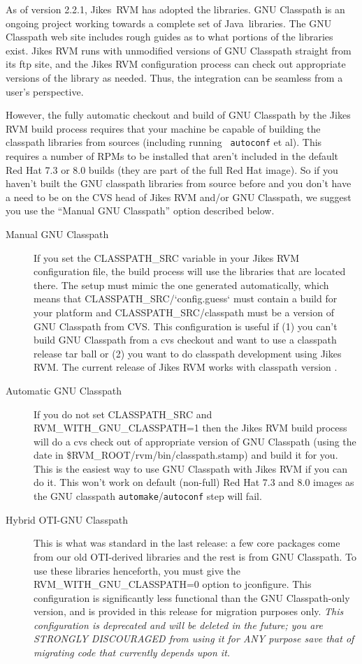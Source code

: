  As of version 2.2.1, Jikes\JikesTMFootnote\ RVM has adopted the
 libraries.  GNU
Classpath is an ongoing project working towards a complete set of
Java\JavaTMFootnote\ libraries. 
The GNU Classpath web site includes
rough guides as to what portions of
the libraries exist. 
Jikes RVM runs with unmodified versions of GNU Classpath straight from its
ftp site, and the Jikes RVM configuration process can check out
appropriate versions of the library as needed.  Thus, the integration
can be seamless from a user's perspective.

However, the fully automatic checkout and build of GNU Classpath by
the Jikes RVM build process requires that your machine be capable of
building the classpath libraries from sources (including running {\tt
autoconf} et al).  This requires a number of RPMs to be installed that
aren't included in the default Red Hat 7.3 or 8.0 builds (they are
part of the full Red Hat image).  So if you haven't built the GNU
classpath libraries from source before and you don't have a need to be
on the CVS head of Jikes RVM and/or GNU Classpath, we suggest you use
the ``Manual GNU Classpath'' option described below.

\begin{description}
\item[Manual GNU Classpath] If you set the CLASSPATH\_SRC variable in
your Jikes RVM configuration file, the build process will use the
libraries that are located there.  The setup must mimic the one
generated automatically, which means that
CLASSPATH\_SRC/`config.guess` must contain a build for your platform
and CLASSPATH\_SRC/classpath must be a version of GNU Classpath from
CVS.  This configuration is useful if (1) you can't build GNU
Classpath from a cvs checkout and want to use a classpath release tar
ball or (2) you want to do classpath development using Jikes RVM. The
current release of Jikes RVM works with classpath version \classpathversion.

\item[Automatic GNU Classpath] If you do not set CLASSPATH\_SRC and 
RVM\_WITH\_GNU\_CLASSPATH=1 then the Jikes RVM build process will do a
cvs check out of appropriate version of GNU Classpath (using the date
in \$RVM\_ROOT/rvm/bin/classpath.stamp) and build it for you.  This is
the easiest way to use GNU Classpath with Jikes RVM if you can do it.
This won't work on default (non-full) Red Hat 7.3 and 8.0 images
as the GNU classpath {\tt automake}/{\tt autoconf} step will fail.

\item[Hybrid OTI-GNU Classpath] This is what was standard in
the last release: a few core packages come from our old OTI-derived
libraries and the rest is from GNU Classpath.  To use these libraries
henceforth, you must give the RVM\_WITH\_GNU\_CLASSPATH=0 option to
jconfigure.  This configuration is significantly less functional than
the GNU Classpath-only version, and is provided in this release for
migration purposes only.  {\em This configuration is deprecated and
will be deleted in the future; you are STRONGLY DISCOURAGED from using
it for ANY purpose save that of migrating code that currently depends
upon it.}
\end{description}


